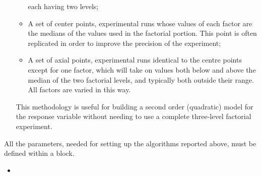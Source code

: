 \begin{itemize}
\begin{itemize}
      each having two levels;
    \item A set of center points, experimental runs whose values of each factor
      are the medians of the values used in the factorial portion.
      This point is often replicated in order to improve the precision of the
      experiment;
    \item A set of axial points, experimental runs identical to the centre
      points except for one factor, which will take on values both below and
      above the median of the two factorial levels, and typically both outside
      their range.
      All factors are varied in this way.
  \end{itemize}
  This methodology is useful for building a second order (quadratic) model for
  the response variable without needing to use a complete three-level factorial
  experiment.
\end{itemize}
All the parameters, needed for setting up the algorithms reported above, must be
defined within a  block.
%
\attrIntro
\begin{itemize}
\itemsep0em
\item \nameDescription
\end{itemize}

